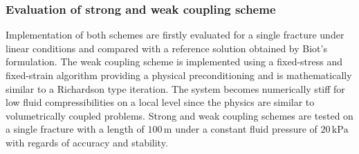 \subsubsection*{Evaluation of strong and weak coupling scheme}
Implementation of both schemes are firstly evaluated for a single fracture under linear conditions and compared with a reference solution obtained by Biot's formulation. The weak coupling scheme is implemented using a fixed-stress and fixed-strain algorithm providing a physical preconditioning and is mathematically similar to a Richardson type iteration. The system becomes numerically stiff for low fluid compressibilities on a local level since the physics are similar to volumetrically coupled problems. Strong and weak coupling schemes are tested on a single fracture with a length of $100 \, \text{m}$ under a constant fluid pressure of $20 \, \text{kPa}$ with regards of accuracy and stability. 
